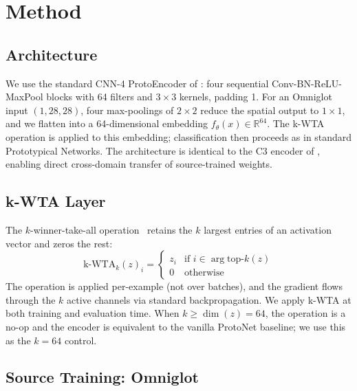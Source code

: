 \documentclass[11pt]{article}
\begin{document}
\section{Method}
\label{sec:method}

\subsection{Architecture}
\label{subsec:arch}

We use the standard CNN-4 ProtoEncoder of \citet{snell2017prototypical}: four sequential Conv-BN-ReLU-MaxPool blocks with 64 filters and $3 \times 3$ kernels, padding 1. For an Omniglot input $(1, 28, 28)$, four max-poolings of $2 \times 2$ reduce the spatial output to $1 \times 1$, and we flatten into a 64-dimensional embedding $f_\theta(x) \in \mathbb{R}^{64}$. The k-WTA operation is applied to this embedding; classification then proceeds as in standard Prototypical Networks. The architecture is identical to the C3 encoder of \citet{pinho2026kwta}, enabling direct cross-domain transfer of source-trained weights.

\subsection{k-WTA Layer}
\label{subsec:kwta}

The $k$-winner-take-all operation~\citep{maass2000computational} retains the $k$ largest entries of an activation vector and zeros the rest:
\begin{equation}
\text{k-WTA}_k(z)_i = \begin{cases} z_i & \text{if } i \in \arg\text{top-}k(z) \\ 0 & \text{otherwise} \end{cases}
\label{eq:kwta}
\end{equation}
The operation is applied per-example (not over batches), and the gradient flows through the $k$ active channels via standard backpropagation. We apply k-WTA at both training and evaluation time. When $k \geq \dim(z) = 64$, the operation is a no-op and the encoder is equivalent to the vanilla ProtoNet baseline; we use this as the $k=64$ control.

\subsection{Source Training: Omniglot}
\label{subsec:source}
\end{document}
